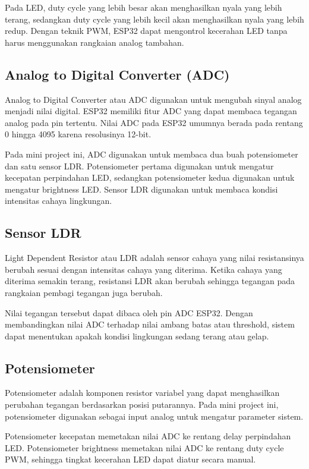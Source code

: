 \documentclass[12pt,a4paper]{article}
\begin{document}
Pada LED, duty cycle yang lebih besar akan menghasilkan nyala yang lebih terang, sedangkan duty cycle yang lebih kecil akan menghasilkan nyala yang lebih redup. Dengan teknik PWM, ESP32 dapat mengontrol kecerahan LED tanpa harus menggunakan rangkaian analog tambahan.

\subsection{Analog to Digital Converter (ADC)}
Analog to Digital Converter atau ADC digunakan untuk mengubah sinyal analog menjadi nilai digital. ESP32 memiliki fitur ADC yang dapat membaca tegangan analog pada pin tertentu. Nilai ADC pada ESP32 umumnya berada pada rentang 0 hingga 4095 karena resolusinya 12-bit.

Pada mini project ini, ADC digunakan untuk membaca dua buah potensiometer dan satu sensor LDR. Potensiometer pertama digunakan untuk mengatur kecepatan perpindahan LED, sedangkan potensiometer kedua digunakan untuk mengatur brightness LED. Sensor LDR digunakan untuk membaca kondisi intensitas cahaya lingkungan.

\subsection{Sensor LDR}
Light Dependent Resistor atau LDR adalah sensor cahaya yang nilai resistansinya berubah sesuai dengan intensitas cahaya yang diterima. Ketika cahaya yang diterima semakin terang, resistansi LDR akan berubah sehingga tegangan pada rangkaian pembagi tegangan juga berubah.

Nilai tegangan tersebut dapat dibaca oleh pin ADC ESP32. Dengan membandingkan nilai ADC terhadap nilai ambang batas atau threshold, sistem dapat menentukan apakah kondisi lingkungan sedang terang atau gelap.

\subsection{Potensiometer}
Potensiometer adalah komponen resistor variabel yang dapat menghasilkan perubahan tegangan berdasarkan posisi putarannya. Pada mini project ini, potensiometer digunakan sebagai input analog untuk mengatur parameter sistem.

Potensiometer kecepatan memetakan nilai ADC ke rentang delay perpindahan LED. Potensiometer brightness memetakan nilai ADC ke rentang duty cycle PWM, sehingga tingkat kecerahan LED dapat diatur secara manual.
\end{document}
